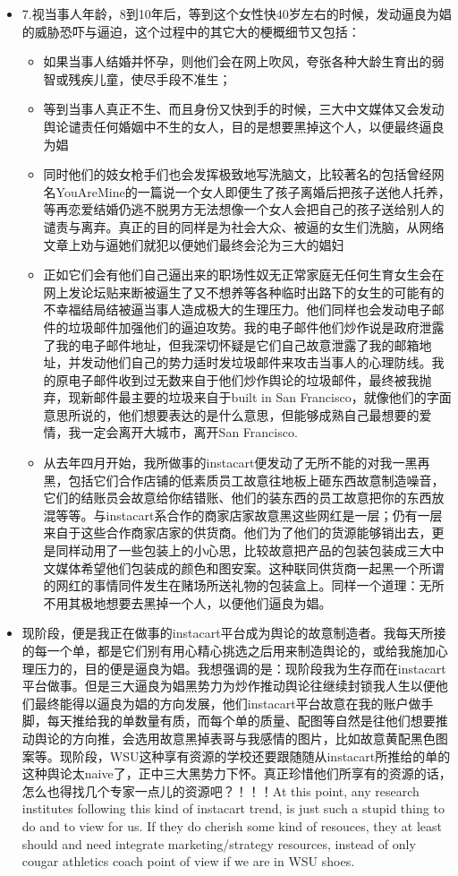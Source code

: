 \documentclass[9pt, b5paper]{article}
\begin{document}
\begin{itemize}
\item 7.视当事人年龄，8到10年后，等到这个女性快40岁左右的时候，发动逼良为娼的威胁恐吓与逼迫，这个过程中的其它大的梗概细节又包括：
\begin{itemize}
\item 如果当事人结婚并怀孕，则他们会在网上吹风，夸张各种大龄生育出的弱智或残疾儿童，使尽手段不准生；
\item 等到当事人真正不生、而且身份又快到手的时候，三大中文媒体又会发动舆论谴责任何婚姻中不生的女人，目的是想要黑掉这个人，以便最终逼良为娼
\item 同时他们的妓女枪手们也会发挥极致地写洗脑文，比较著名的包括曾经网名YouAreMine的一篇说一个女人即便生了孩子离婚后把孩子送他人托养，等再恋爱结婚仍逃不脱男方无法想像一个女人会把自己的孩子送给别人的谴责与离弃。真正的目的同样是为社会大众、被逼的女生们洗脑，从网络文章上劝与逼她们就犯以便她们最终会沦为三大的娼妇
\item 正如它们会有他们自己逼出来的职场性奴无正常家庭无任何生育女生会在网上发论坛贴来断被逼生了又不想养等各种临时出路下的女生的可能有的不幸福结局结被逼当事人造成极大的生理压力。他们同样也会发动电子邮件的垃圾邮件加强他们的逼迫攻势。我的电子邮件他们炒作说是政府泄露了我的电子邮件地址，但我深切怀疑是它们自己故意泄露了我的邮箱地址，并发动他们自己的势力适时发垃圾邮件来攻击当事人的心理防线。我的原电子邮件收到过无数来自于他们炒作舆论的垃圾邮件，最终被我抛弃，现新邮件最主要的垃圾来自于built in San Francisco，就像他们的字面意思所说的，他们想要表达的是什么意思，但能够成熟自己最想要的爱情，我一定会离开大城市，离开San Francisco.
\item 从去年四月开始，我所做事的instacart便发动了无所不能的对我一黑再黑，包括它们合作店铺的低素质员工故意往地板上砸东西故意制造噪音，它们的结账员会故意给你结错账、他们的装东西的员工故意把你的东西放混等等。与instacart系合作的商家店家故意黑这些网红是一层；仍有一层来自于这些合作商家店家的供货商。他们为了他们的货源能够销出去，更是同样动用了一些包装上的小心思，比较故意把产品的包装包装成三大中文媒体希望他们包装成的颜色和图安案。这种联同供货商一起黑一个所谓的网红的事情同件发生在赌场所送礼物的包装盒上。同样一个道理：无所不用其极地想要去黑掉一个人，以便他们逼良为娼。
\end{itemize}
\item 现阶段，便是我正在做事的instacart平台成为舆论的故意制造者。我每天所接的每一个单，都是它们别有用心精心挑选之后用来制造舆论的，或给我施加心理压力的，目的便是逼良为娼。我想强调的是：现阶段我为生存而在instacart平台做事。但是三大逼良为娼黑势力为炒作推动舆论往继续封锁我人生以便他们最终能得以逼良为娼的方向发展，他们instacart平台故意在我的账户做手脚，每天推给我的单数量有质，而每个单的质量、配图等自然是往他们想要推动舆论的方向推，会选用故意黑掉表哥与我感情的图片，比如故意黄配黑色图案等。现阶段，WSU这种享有资源的学校还要跟随随从instacart所推给的单的这种舆论太naive了，正中三大黑势力下怀。真正珍惜他们所享有的资源的话，怎么也得找几个专家一点儿的资源吧？！！！At this point, any research institutes following this kind of instacart trend, is just such a stupid thing to do and to view for us. If they do cherish some kind of resouces, they at least should and need integrate marketing/strategy resources, instead of only cougar athletics coach point of view if we are in WSU shoes.
\end{itemize}
\end{document}
